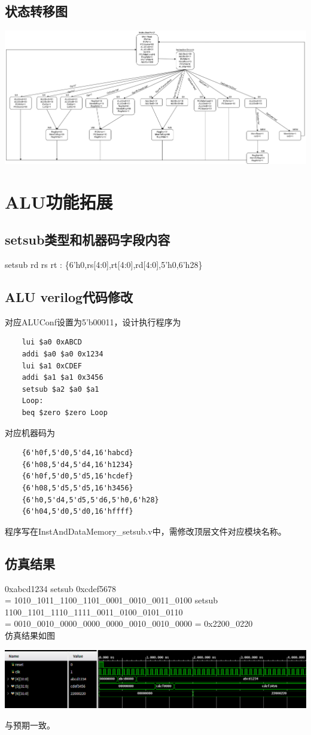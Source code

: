 \documentclass{article}
\begin{document}
\subsection{状态转移图}
\begin{center}
    \includegraphics[width = 18cm]{images/fsm.png}
\end{center}


\section{ALU功能拓展}
\subsection{setsub类型和机器码字段内容}
setsub rd rs rt : \{6'h0,rs[4:0],rt[4:0],rd[4:0],5'h0,6'h28\}
\subsection{ALU verilog代码修改}
对应ALUConf设置为5'b00011，设计执行程序为
\begin{lstlisting}
    lui $a0 0xABCD      
    addi $a0 $a0 0x1234  
    lui $a1 0xCDEF
    addi $a1 $a1 0x3456  
    setsub $a2 $a0 $a1
    Loop:
    beq $zero $zero Loop
\end{lstlisting}
对应机器码为
\begin{lstlisting}
    {6'h0f,5'd0,5'd4,16'habcd}
    {6'h08,5'd4,5'd4,16'h1234}
    {6'h0f,5'd0,5'd5,16'hcdef}
    {6'h08,5'd5,5'd5,16'h3456}
    {6'h0,5'd4,5'd5,5'd6,5'h0,6'h28}
    {6'h04,5'd0,5'd0,16'hffff}
\end{lstlisting}
程序写在InstAndDataMemory\_setsub.v中，需修改顶层文件对应模块名称。
\subsection{仿真结果}
0xabcd1234 setsub 0xcdef5678  \\
= 1010\_1011\_1100\_1101\_0001\_0010\_0011\_0100 setsub 1100\_1101\_1110\_1111\_0011\_0100\_0101\_0110\\
= 0010\_0010\_0000\_0000\_0000\_0010\_0010\_0000 = 0x2200\_0220\\
仿真结果如图
\begin{center}
    \includegraphics[width = 16cm]{images/sim_setsub_waveform.png}
\end{center}
与预期一致。
\end{document}

